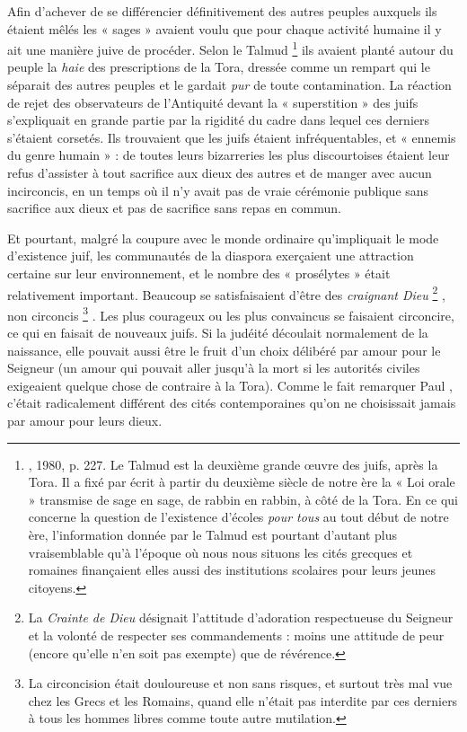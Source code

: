  Afin d'achever de se différencier définitivement des autres peuples auxquels ils étaient mêlés les « sages » avaient voulu que pour chaque activité humaine il y ait une manière juive de procéder. Selon le Talmud%
\footnote{, 1980, p. 227. Le Talmud est la deuxième grande œuvre des juifs, après la Tora. Il a fixé par écrit à partir du deuxième siècle de notre ère la « Loi orale » transmise de sage en sage, de rabbin en rabbin, à côté de la Tora. En ce qui concerne la question de l'existence d'écoles \emph{pour tous} au tout début de notre ère, l'information donnée par le Talmud est pourtant d'autant plus vraisemblable qu'à l'époque où nous nous situons les cités grecques et romaines finançaient elles aussi des institutions scolaires pour leurs jeunes citoyens.}
ils avaient planté autour du peuple la \emph{haie} des prescriptions de la Tora, dressée comme un rempart qui le séparait des autres peuples et le gardait \emph{pur} de toute contamination. La réaction de rejet des observateurs de l'Antiquité devant la « superstition » des juifs s'expliquait en grande partie par la rigidité du cadre dans lequel ces derniers s'étaient corsetés. Ils trouvaient que les juifs étaient infréquentables, et « ennemis du genre humain » : de toutes leurs bizarreries les plus discourtoises étaient leur refus d'assister à tout sacrifice aux dieux des autres et de manger avec aucun incirconcis, en un temps où il n'y avait pas de vraie cérémonie publique sans sacrifice aux dieux et pas de sacrifice sans repas en commun. 

 Et pourtant, malgré la coupure avec le monde ordinaire qu'impliquait le mode d'existence juif, les communautés de la diaspora exerçaient une attraction certaine sur leur environnement, et le nombre des « prosélytes » était relativement important. Beaucoup se satisfaisaient d'être des \emph{craignant Dieu}%
\footnote{La \emph{Crainte de Dieu} désignait l'attitude d'adoration respectueuse du Seigneur et la volonté de respecter ses commandements : moins une attitude de peur (encore qu'elle n'en soit pas exempte) que de révérence.}%
, non circoncis%
\footnote{La circoncision était douloureuse et non sans risques, et surtout très mal vue chez les Grecs et les Romains, quand elle n'était pas interdite par ces derniers à tous les hommes libres comme toute autre mutilation.}%
. Les plus courageux ou les plus convaincus se faisaient circoncire, ce qui en faisait de nouveaux juifs. Si la judéité découlait normalement de la naissance, elle pouvait aussi être le fruit d'un choix délibéré par amour pour le Seigneur (un amour qui pouvait aller jusqu'à la mort si les autorités civiles exigeaient quelque chose de contraire à la Tora). Comme le fait remarquer Paul , c'était radicalement différent des cités contemporaines qu'on ne choisissait jamais par amour pour leurs dieux.

